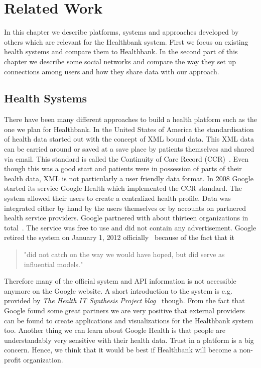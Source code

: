 \chapter{Related Work} 
\label{chap:relatedwork}

In this chapter we describe platforms, systems and approaches developed by others which are relevant for the Healthbank system. First we focus on existing health systems and compare them to Healthbank. In the second part of this chapter we describe some social networks and compare the way they set up connections among users and how they share data with our approach.


\section{Health Systems}

There have been many different approaches to build a health platform such as the one we plan for Healthbank.  \newline
In the United States of America the standardisation of health data started out with the concept of XML bound data. This XML data can be carried around or saved at a save place by patients themselves and shared via email. This standard is called the Continuity of Care Record (CCR)~\cite{kibbe2004continuity}. Even though this was a good start and patients were in possession of parts of their health data, XML is not particularly a user friendly data format. \newline
In 2008 Google started its service Google Health which implemented the CCR standard. The system allowed their users to create a centralized health profile. Data was integrated either by hand by the users themselves or by accounts on partnered health service providers. Google partnered with about thirteen organizations in total~\cite{googlehealthwiki}. The service was free to use and did not contain any advertisement. Google retired the system on January 1, 2012 officially~\cite{googleblog} because of the fact that it 
\begin{quote}
"did not catch on the way we would have hoped, but did serve as influential models."
\end{quote} 
Therefore many of the official system and API information is not accessible anymore on the Google website. A short introduction to the system is e.g. provided by \emph{The Health IT Synthesis Project blog~\cite{hisp}} though. From the fact that Google found some great partners we are very positive that external providers can be found to create applications and visualizations for the Healthbank system too. Another thing we can learn about Google Health is that people are understandably very sensitive with their health data. Trust in a platform is a big concern. Hence, we think that it would be best if Healthbank will become a non-profit organization. 


